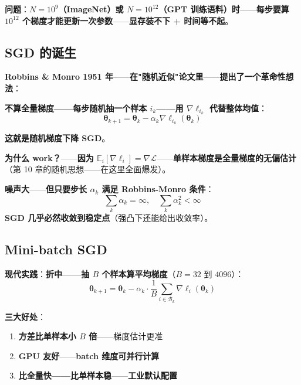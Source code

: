 \textbf{问题}：\textbf{$N = 10^9$（ImageNet）或 $N = 10^{12}$（GPT 训练语料）时}——\textbf{每步要算 $10^{12}$ 个梯度才能更新一次参数}——\textbf{显存装不下 + 时间等不起}。

\subsection{SGD 的诞生}

\textbf{Robbins \& Monro 1951 年}——\textbf{在"随机近似"论文里}——\textbf{提出了一个革命性想法}：

\textbf{不算全量梯度——\textbf{每步随机抽一个样本 $i_k$——用 $\nabla \ell_{i_k}$ 代替整体均值}}：
\begin{equation}
\boxed{\, \bm \theta_{k+1} = \bm \theta_k - \alpha_k \nabla \ell_{i_k}(\bm \theta_k) \,}
\end{equation}

\textbf{这就是\textbf{随机梯度下降 SGD}}。

\textbf{为什么 work？}——\textbf{因为 $\mathbb{E}_i[\nabla \ell_i] = \nabla \mathcal{L}$}——\textbf{\textbf{单样本梯度是全量梯度的无偏估计}}（第 10 章的随机思想——在这里全面爆发）。

\textbf{噪声大}——\textbf{但只要步长 $\alpha_k$ 满足 Robbins-Monro 条件}：
\begin{equation}
\sum_k \alpha_k = \infty, \quad \sum_k \alpha_k^2 < \infty
\end{equation}
\textbf{SGD 几乎必然收敛到稳定点}（强凸下还能给出收敛率）。

\subsection{Mini-batch SGD}

\textbf{现代实践}：\textbf{折中——抽 $B$ 个样本算平均梯度}（$B = 32$ 到 $4096$）：
\begin{equation}
\bm \theta_{k+1} = \bm \theta_k - \alpha_k \cdot \frac{1}{B} \sum_{i \in \mathcal{B}_k} \nabla \ell_i(\bm \theta_k)
\end{equation}

\textbf{三大好处}：
\begin{enumerate}
\item \textbf{方差比单样本小 $B$ 倍}——梯度估计更准
\item \textbf{GPU 友好}——\textbf{batch 维度可\textbf{并行}计算}
\item \textbf{比全量快——比单样本稳}——\textbf{工业默认配置}
\end{enumerate}

